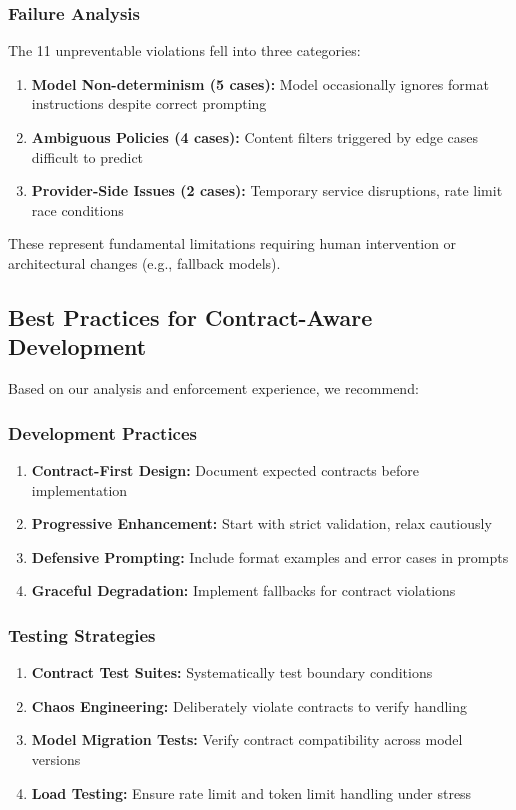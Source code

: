 \documentclass[11pt]{article}
\begin{document}
\subsubsection{Failure Analysis}

The 11 unpreventable violations fell into three categories:

\begin{enumerate}
    \item \textbf{Model Non-determinism (5 cases):} Model occasionally ignores format instructions despite correct prompting
    \item \textbf{Ambiguous Policies (4 cases):} Content filters triggered by edge cases difficult to predict
    \item \textbf{Provider-Side Issues (2 cases):} Temporary service disruptions, rate limit race conditions
\end{enumerate}

These represent fundamental limitations requiring human intervention or architectural changes (e.g., fallback models).

\subsection{Best Practices for Contract-Aware Development}

Based on our analysis and enforcement experience, we recommend:

\subsubsection{Development Practices}
\begin{enumerate}
    \item \textbf{Contract-First Design:} Document expected contracts before implementation
    \item \textbf{Progressive Enhancement:} Start with strict validation, relax cautiously
    \item \textbf{Defensive Prompting:} Include format examples and error cases in prompts
    \item \textbf{Graceful Degradation:} Implement fallbacks for contract violations
\end{enumerate}

\subsubsection{Testing Strategies}
\begin{enumerate}
    \item \textbf{Contract Test Suites:} Systematically test boundary conditions
    \item \textbf{Chaos Engineering:} Deliberately violate contracts to verify handling
    \item \textbf{Model Migration Tests:} Verify contract compatibility across model versions
    \item \textbf{Load Testing:} Ensure rate limit and token limit handling under stress
\end{enumerate}
\end{document}
